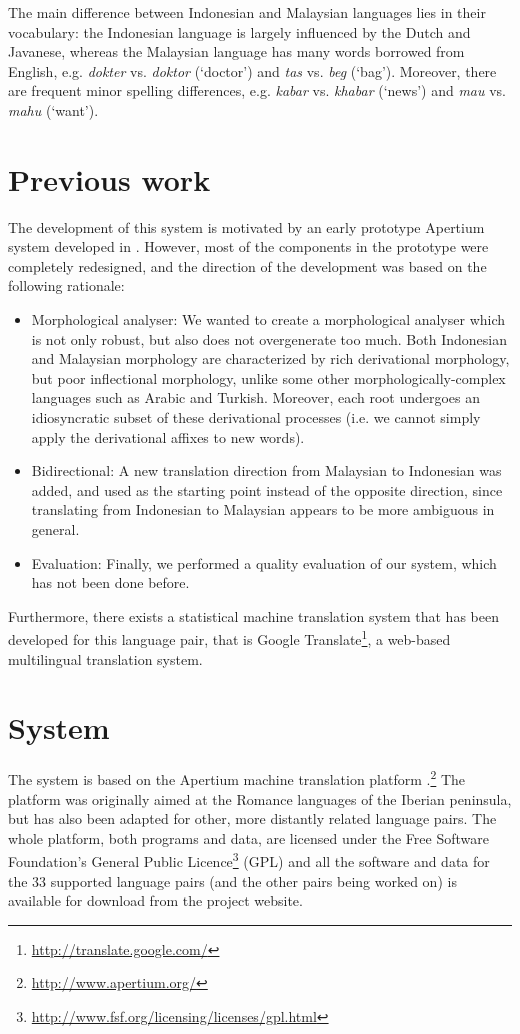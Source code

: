 \documentclass[10pt,a5paper,twoside]{article}
\begin{document}
The main difference between Indonesian and Malaysian languages lies in their vocabulary: the Indonesian language is largely influenced by the Dutch and Javanese, whereas the Malaysian language has many words borrowed from English, e.g. \emph{dokter} vs. \emph{doktor} (`doctor') and \emph{tas} vs. \emph{beg} (`bag'). Moreover, there are frequent minor spelling differences, e.g. \emph{kabar} vs. \emph{khabar} (`news') and \emph{mau} vs. \emph{mahu} (`want').

\section{Previous work}
\label{sec:prev}
The development of this system is motivated by an early prototype Apertium system developed in \citep{larasati2010study}. However, most of the components in the prototype were completely redesigned, and the direction of the development was based on the following rationale:
\begin{itemize}
\item{Morphological analyser: We wanted to create a morphological analyser which is not only robust, but also does not overgenerate too much. Both Indonesian and Malaysian morphology are characterized by rich derivational morphology, but poor inflectional morphology, unlike some other morphologically-complex languages such as Arabic and Turkish. Moreover, each root undergoes an idiosyncratic subset of these derivational processes (i.e. we cannot simply apply the derivational affixes to new words).}
\item{Bidirectional: A new translation direction from Malaysian to Indonesian was added, and used as the starting point instead of the opposite direction, since translating from Indonesian to Malaysian appears to be more ambiguous in general.}
\item{Evaluation: Finally, we performed a quality evaluation of our system, which has not been done before.}
\end{itemize}
Furthermore, there exists a statistical machine translation system that has been developed for this language pair, that is Google Translate\footnote{\url{http://translate.google.com/}}, a web-based multilingual translation system.

\section{System}
\label{sec:sys}
The system is based on the Apertium machine translation platform \citep{apertium/2011}.\footnote{\url{http://www.apertium.org/}} The platform was originally aimed at the Romance languages of the Iberian peninsula, but has also been adapted for other, more distantly related language pairs. The whole platform, both programs and data, are licensed under the Free Software Foundation's General Public Licence\footnote{\url{http://www.fsf.org/licensing/licenses/gpl.html}} (GPL) and all the software and data for the 33 supported language pairs (and the other pairs being worked on) is available for download from the project website.
\end{document}
